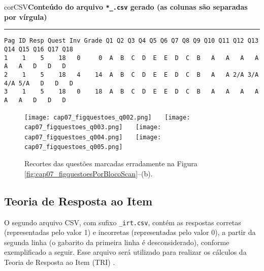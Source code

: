 \begin{myboxCode}{corCSV}{\textbf{Conteúdo do arquivo \texttt{*\_.csv} gerado (as colunas são separadas por vírgula)}}\vspace{3mm}
\hrule
{\footnotesize
\begin{verbatim}
Pag ID Resp Quest Inv Grade Q1 Q2 Q3 Q4 Q5 Q6 Q7 Q8 Q9 Q10 Q11 Q12 Q13 Q14 Q15 Q16 Q17 Q18
1    1    5    18   0     0  A  B  C  D  E  E  D  C  B   A   A   A   A   A   A   D   D   D
2    1    5    18   4    14  A  B  C  D  E  E  D  C  B   A   A 2/A 3/A 4/A 5/A   D   D   D
3    1    5    18   0    18  A  B  C  D  E  E  D  C  B   A   A   A   A   A   A   D   D   D
\end{verbatim}
}
\end{myboxCode}


\begin{figure}[!ht]
\centering
\texttt{[image: cap07\_figquestoes\_q002.png]} \ \ \ 
\texttt{[image: cap07\_figquestoes\_q003.png]} \ \ \ 
\texttt{[image: cap07\_figquestoes\_q004.png]} \ \ \ 
\texttt{[image: cap07\_figquestoes\_q005.png]} \ \ \ 
\caption{Recortes das questões marcadas erradamente na Figura \ref{fig:cap07_figquestoesPorBlocoScan}--(b).}
\label{fig:cap07_figquestoesPorBlocoScanErros}
\end{figure}

\subsection{Teoria de Resposta ao Item}

O segundo arquivo CSV, com sufixo \verb|_irt.csv|, contém as respostas corretas (representadas pelo valor 1) e incorretas (representadas pelo valor 0), a partir da segunda linha (o gabarito da primeira linha é desconsiderado), conforme exemplificado a seguir. Esse arquivo será utilizado para realizar os cálculos da Teoria de Resposta ao Item (TRI) \cite{birnbaum1968some}.

